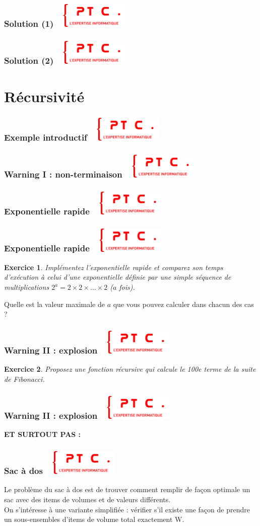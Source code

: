 \documentclass[11pt]{beamer}
\newenvironment{slide}[1]{%
\begin{frame}[environment=slide]
\frametitle{#1~\hfill~\includegraphics[height=1.2cm]{./epitech.png}}
}{%
\end{frame}
}
\newtheorem{exercice}{Exercice}
\newcommand{\Python}[1]{
	{\small	}
}
\begin{document}
\begin{slide}{Solution (1)}
\Python{pb2bisa}
\end{slide}

\begin{slide}{Solution (2)}
\Python{pb2bisb}
\end{slide}

\section{Récursivité}

\begin{slide}{Exemple introductif}
\Python{recfac}
\end{slide}

\begin{slide}{Warning I : non-terminaison}
\Python{badrec}
\end{slide}

\begin{slide}{Exponentielle rapide}
\Python{fastexp}
\end{slide}


\begin{slide}{Exponentielle rapide}
\begin{exercice}
Implémentez l'exponentielle rapide et comparez son temps d'exécution à celui d'une exponentielle définie par une simple séquence de multiplications $2^a = 2 \times 2 \times \ldots \times 2$ ($a$ fois).
\end{exercice}

Quelle est la valeur maximale de $a$ que vous pouvez calculer dans chacun des cas ?
\end{slide}

\begin{slide}{Warning II : explosion}
\begin{exercice}
Proposez une fonction récursive qui calcule le 100e terme de la suite de Fibonacci.
\end{exercice}
\end{slide}

\begin{slide}{Warning II : explosion}
\Python{ex16}
\textbf{\color{red}ET SURTOUT PAS :}
\Python{ex16w}
\end{slide}

\begin{slide}{Sac à dos}
Le problème du sac à dos est de trouver comment remplir de façon optimale un sac avec des items de volumes et de valeurs différents.\\
\pause
\vspace{0.2cm}
On s'intéresse à une variante simplifiée : vérifier s'il existe une façon de prendre un sous-ensembles d'items de volume total exactement W.
\end{slide}
\end{document}
